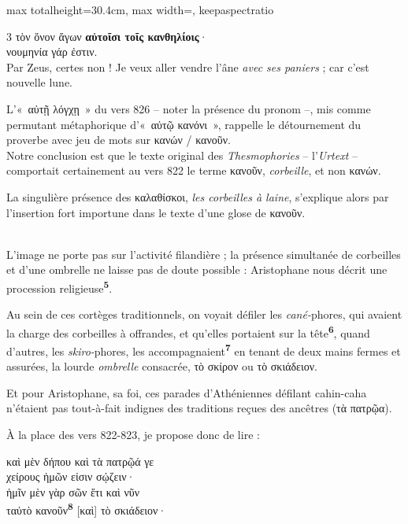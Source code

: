 \documentclass[11pt,twoside]{book}
\newcommand{\italique}[1]{\textit{#1}}
\newcommand{\citComm}[1]{\begin{quoting}[vskip=0.4pt,leftmargin=0.7em,rightmargin=0.2em]#1\end{quoting}}
\newcommand{\allemand}[1]{\textit{#1}}
\newcommand{\marqueur}[1]{\textsuperscript{\color{rubricRed}\textbf{#1}}}
\begin{document}
\begin{adjustbox}{max totalheight=30.4cm, max width=\textwidth, keepaspectratio}
\begin{minipage}{\textwidth}
{\begin{multicols}{3}
{τὸν ὄνον ἄγων \textbf{αὐτοῖσι τοῖς κανθηλίοις}·\\
νουμηνία γάρ ἐστιν.\\
Par Zeus, certes non ! Je veux aller vendre l'âne \italique{avec ses paniers} ; car c'est nouvelle lune.}
\par\vspace{1.5pt}
\noindent L'«~αὐτῇ λόγχῃ~» du vers 826 -- noter la présence du pronom --, mis comme permutant métaphorique d'«~αὐτῷ κανόνι~», rappelle le détournement du proverbe avec jeu de mots sur κανών / κανοῦν.\\ Notre conclusion est que le texte original des \italique{Thesmophories} -- l'\allemand{Urtext} -- comportait certainement au vers 822 le terme κανοῦν, \italique{corbeille}, et non κανών.
\par\vspace{1.5pt}
\noindent La singulière présence des καλαθίσκοι, \italique{les corbeilles à laine}, s'explique alors par l'insertion fort importune dans le texte d'une glose de κανοῦν.
\par\vspace{1.5pt}
\noindent \\ L'image ne porte pas sur l'activité filandière ; la présence simultanée de corbeilles et d'une ombrelle ne laisse pas de doute possible : Aristophane nous décrit une procession religieuse\marqueur{5}.
\par\vspace{1.5pt}
\noindent Au sein de ces cortèges traditionnels, on voyait défiler les \italique{cané-}phores, qui avaient la charge des corbeilles à offrandes, et qu'elles portaient sur la tête\marqueur{6}, quand d'autres, les \italique{skiro-}phores, les accompagnaient\marqueur{7} en tenant de deux mains fermes et assurées, la lourde \italique{ombrelle} consacrée, τὸ σκίρον ou τὸ σκιάδειον.
\par\vspace{1.5pt}
\noindent Et pour Aristophane, sa foi, ces parades d'Athéniennes défilant cahin-caha n'étaient pas tout-à-fait indignes des traditions reçues des ancêtres (τὰ πατρῷα).
\par\vspace{1.5pt}
\noindent À la place des vers 822-823, je propose donc de lire :
\citComm{καὶ μὲν δήπου καὶ τὰ πατρῷά γε\\
χείρους ἡμῶν εἰσιν σῴζειν·\\
ἡμῖν μὲν γὰρ σῶν ἔτι καὶ νῦν\\
ταὐτὸ κανοῦν\marqueur{8} [καὶ] τὸ σκιάδειον·\\
}
\end{multicols}}
\end{minipage}
\end{adjustbox}
\end{document}
